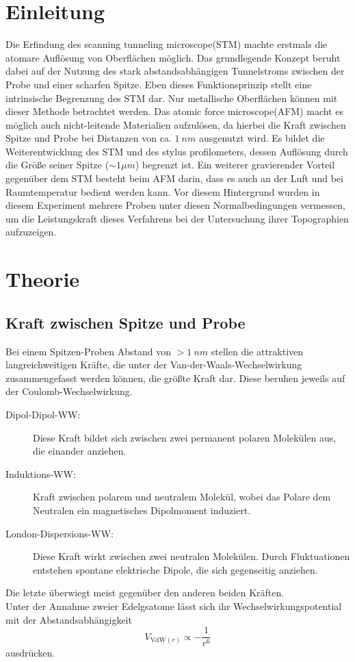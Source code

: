 \section*{Einleitung}
Die Erfindung des \glqq scanning tunneling microscope\grqq (STM) machte erstmals die atomare Auflösung von Oberflächen möglich.
Das grundlegende Konzept beruht dabei auf der Nutzung des stark abstandsabhängigen Tunnelstroms zwischen der Probe und einer scharfen Spitze.
Eben dieses Funktionsprinzip stellt eine intrinsische Begrenzung des STM dar.
Nur metallische Oberflächen können mit dieser Methode betrachtet werden.
Das \glqq atomic force microscope\grqq (AFM) macht es möglich auch nicht-leitende Materialien aufzulösen, da hierbei die Kraft zwischen Spitze und Probe bei Distanzen von ca. $\SI{1}{nm}$ ausgenutzt wird.
Es bildet die Weiterentwicklung des STM und des stylus profilometers, dessen Auflösung durch die Größe seiner Spitze ($\sim 1\mu m$) begrenzt ist.
Ein weiterer gravierender Vorteil gegenüber dem STM besteht beim AFM darin, dass es auch an der Luft und bei Raumtemperatur bedient werden kann.
Vor diesem Hintergrund wurden in diesem Experiment mehrere Proben unter diesen Normalbedingungen vermessen, um die Leistungskraft dieses Verfahrens bei der Untersuchung ihrer Topographien aufzuzeigen.

\section{Theorie}
\subsection{Kraft zwischen Spitze und Probe}
    Bei einem Spitzen-Proben Abstand von $> \SI{1}{nm}$ stellen die attraktiven langreichweitigen Kräfte, die unter der Van-der-Waals-Wechselwirkung zusammengefasst werden können, die größte Kraft dar. Diese beruhen jeweils auf der Coulomb-Wechselwirkung.
    \hspace{3cm}
    \begin{description}
        \item[Dipol-Dipol-WW:]  Diese Kraft bildet sich zwischen zwei permanent polaren Molekülen aus, die einander anziehen.
        \item[Induktions-WW:]  Kraft zwischen polarem und neutralem Molekül, wobei das Polare dem Neutralen ein magnetisches Dipolmoment induziert.
        \item[London-Dispersions-WW:]  Diese Kraft wirkt zwischen zwei neutralen Molekülen. Durch Fluktuationen entstehen spontane elektrische Dipole, die sich gegenseitig anziehen.
    \end{description}
    Die letzte überwiegt meist gegenüber den anderen beiden Kräften. \\
    Unter der Annahme zweier Edelgsatome lässt sich ihr Wechselwirkungspotential mit der Abstandsabhängigkeit
    \begin{equation*}
        V_{\mathrm{VdW}(r)} \propto -\frac{1}{r^6}
    \end{equation*}
    ausdrücken.

